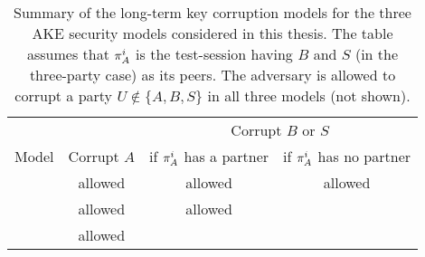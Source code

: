 \begin{table}

	\caption{
		Summary of the long-term key corruption models for the three AKE security models considered in this thesis.
		The table assumes that $\oracle[A][i]$ is the test-session having $B$ and $S$ (in the three-party case) as its peers.
		The adversary is allowed to corrupt a party $U \notin \lbrace A, B, S \rbrace$
		in all three models
		(not shown).
	}
	
	\label{table:security_models_summary}
	
	\begin{threeparttable}
	\begin{adjustbox}{center}
		\begin{tabular}{lccc}  
			\toprule
			
			    & & \multicolumn{2}{c}{\hspace{2pt} Corrupt $B$ or $S$ \hspace{2pt}}    \\
			
			\cmidrule(r){3-4}
			
			Model  & \hspace{5pt} Corrupt $A$  \hspace{5pt} & if $\oracle[A][i]$ has a partner & \hspace{1pt} if $\oracle[A][i]$ has no partner \hspace{1pt} \\
			
			\midrule
			
			\akefstext    & allowed\tnote{1}   & allowed   &  allowed\tnote{2}  \\
			
			\akewfstext   & allowed\tnote{1}    & allowed  &   \texttimes  \\
			
			\akenfstext  & allowed\tnote{1}    & \texttimes   & \texttimes    \\
			
			\bottomrule
		\end{tabular}
	

\end{adjustbox}
\end{threeparttable}
\end{table}
